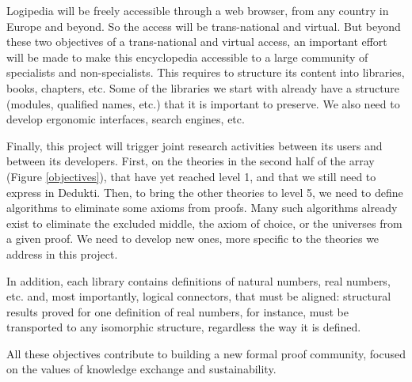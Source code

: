 {\sf Logipedia} will be freely accessible through a web browser, from
any country in Europe and beyond. So the access will be trans-national
and virtual. But beyond these two objectives of a trans-national and
virtual access, an important effort will be made to make this
encyclopedia accessible to a large community of specialists and
non-specialists. This requires to structure its content into
libraries, books, chapters, etc. Some of the libraries we start with
already have a structure (modules, qualified names, etc.) that it is
important to preserve. We also need to develop ergonomic interfaces,
search engines, etc.

Finally, this project will trigger joint research activities between
its users and between its developers.  First, on the theories in the
second half of the array (Figure \ref{objectives}), that have yet
reached level 1, and that we still need to express in {\sf
  Dedukti}. Then, to bring the other theories to level 5, we need to
define algorithms to eliminate some axioms from proofs. Many such
algorithms already exist to eliminate the excluded middle, the axiom
of choice, or the universes from a given proof. We need to develop new
ones, more specific to the theories we address in this project.

In addition, each library contains definitions of natural numbers,
real numbers, etc. and, most importantly, logical connectors, that
must be aligned: structural results proved for one definition of real
numbers, for instance, must be transported to any isomorphic structure, 
regardless the way it is defined.

All these objectives contribute to building a new formal proof
community, focused on the values of knowledge exchange and
sustainability.


